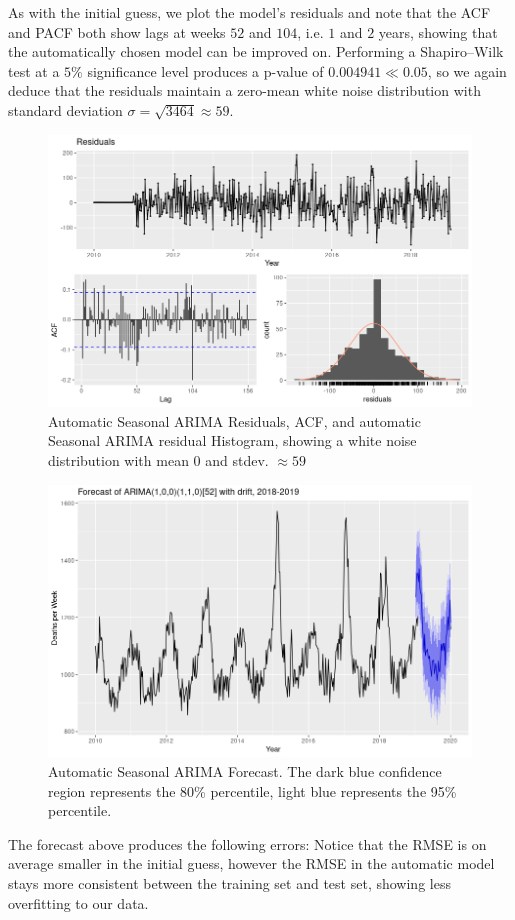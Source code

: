 \documentclass[a4paper, oneside]{discothesis}
\begin{document}
As with the initial guess, we plot the model's residuals and note that the ACF and PACF both show lags at weeks $52$ and $104$, i.e. $1$ and $2$ years, showing that the automatically chosen model can be improved on. Performing a Shapiro--Wilk test at a $5\%$ significance level produces a p-value of $0.004941 \ll 0.05$, so we again deduce that the residuals maintain a zero-mean white noise distribution with standard deviation $\sigma = \sqrt{3464} \approx 59$.
\begin{figure}[H]
\centering
\includegraphics[width=.8\textwidth]{figures/arima_auto_resid_acf.png}
\caption{Automatic Seasonal ARIMA Residuals, ACF, and automatic Seasonal ARIMA residual Histogram, showing a white noise distribution with mean $0$ and stdev. $\approx 59$}
\end{figure}
\begin{figure}[H]
\centering
\includegraphics[width=.8\textwidth]{figures/arima_auto_forecast.png}
\caption{Automatic Seasonal ARIMA Forecast. The dark blue confidence region represents the 80\% percentile, light blue represents the 95\% percentile.}
\end{figure}
The forecast above produces the following errors:
Notice that the RMSE is on average smaller in the initial guess, however the RMSE in the automatic model stays more consistent between the training set and test set, showing less overfitting to our data.
\end{document}
